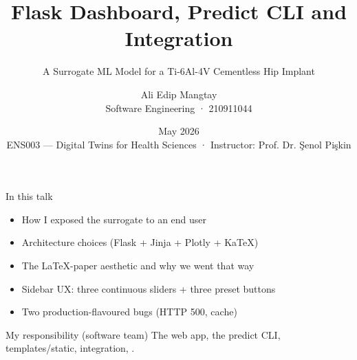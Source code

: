 

\newcommand{\courseHeader}{ENS003 --- Digital Twins for Health Sciences}
\newcommand{\courseSubheader}{Istinye University · Faculty of Engineering and Natural Sciences}
\newcommand{\instructor}{Instructor: Prof. Dr. Şenol Pişkin}
\newcommand{\projectTitle}{A Surrogate ML Model for a Ti-6Al-4V Cementless Hip Implant}

\title{Flask Dashboard, Predict CLI and Integration}
\subtitle{\projectTitle}
\author{Ali Edip Mangtay \\ \small Software Engineering · 210911044}
\date{May 2026 \\ \scriptsize \courseHeader{} · \instructor}



\maketitle

\begin{frame}{In this talk}
  \begin{itemize}
    \item How I exposed the surrogate to an end user
    \item Architecture choices (Flask + Jinja + Plotly + KaTeX)
    \item The LaTeX-paper aesthetic and why we went that way
    \item Sidebar UX: three continuous sliders + three preset buttons
    \item Two production-flavoured bugs (HTTP 500, cache)
  \end{itemize}
  \vspace{0.4cm}
  \begin{block}{My responsibility (software team)}
    The web app, the predict CLI, templates/static, integration,
    .
  \end{block}
\end{frame}


